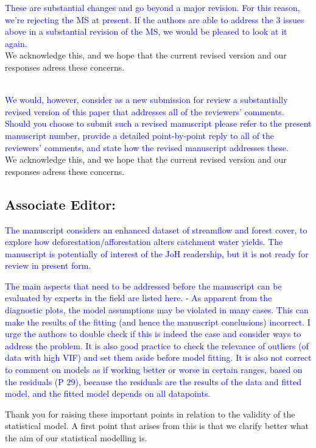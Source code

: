 \documentclass[]{elsarticle} %
\begin{document}
\textcolor{blue}{These are substantial changes and go beyond a major revision.  For this reason, we're rejecting the MS at present.  If the authors are able to address the 3 issues above in a substantial revision of the MS, we would be pleased to look at it again.}\\
We acknowledge this, and we hope that the current revised version and our responses adress these concerns.\\
\strut \\
\textcolor{blue}{We would, however, consider as a new submission for review a substantially revised version of this paper that addresses all of the reviewers' comments.  Should you choose to submit such a revised manuscript please refer to the present manuscript number, provide a detailed point-by-point reply to all of the reviewers' comments, and state how the revised manuscript addresses these.}\\
We acknowledge this, and we hope that the current revised version and our responses adress these concerns.\\

\hypertarget{associate-editor}{%
\subsection{Associate Editor:}\label{associate-editor}}

\textcolor{blue}{The manuscript considers an enhanced dataset of streamflow and forest cover, to explore how deforestation/afforestation alters catchment water yields. The manuscript is potentially of interest of the JoH readership, but it is not ready for review in present form.}

\textcolor{blue}{The main aspects that need to be addressed before the manuscript can be evaluated by experts in the field are listed here. 
- As apparent from the diagnostic plots, the model assumptions may be violated in many cases. This can make the results of the fitting (and hence the manuscript conclusions) incorrect. I urge the authors to double check if this is indeed the case and consider ways to address the problem. It is also good practice to check the relevance of outliers (of data with high VIF) and set them aside before model fitting. It is also not correct to comment on models as if working better or worse in certain ranges, based on the residuals (P 29), because the residuals are the results of the data and fitted model, and the fitted model depends on all datapoints.}

Thank you for raising these important points in relation to the validity of the statistical model.
A first point that arises from this is that we clarify better what the aim of our statistical modelling is.
\end{document}
